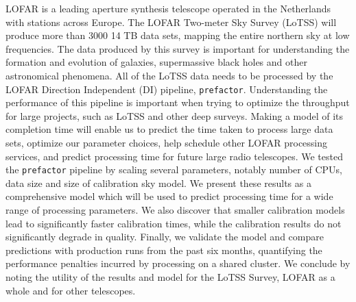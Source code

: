 LOFAR is a leading aperture synthesis telescope operated in the Netherlands with stations across Europe. The LOFAR Two-meter Sky Survey (LoTSS) will produce more than 3000 14 TB data sets, mapping the entire northern sky at low frequencies. The data produced by this survey is important for understanding the formation and evolution of galaxies, supermassive black holes and other astronomical phenomena. All of the LoTSS data needs to be processed by the LOFAR Direction Independent (DI) pipeline, \texttt{prefactor}. Understanding the performance of this pipeline is important when trying to optimize the throughput for  large projects, such as LoTSS and other deep surveys. Making a model of its completion time will enable us to predict the time taken to process large data sets, optimize our parameter choices, help schedule other LOFAR processing services, and predict processing time for future large radio telescopes. We tested the \texttt{prefactor} pipeline by scaling several parameters, notably number of CPUs, data size and size of calibration sky model. We present these results as a comprehensive model which will be used to predict processing time for a wide range of processing parameters. We also discover that smaller calibration models lead to significantly faster calibration times, while the calibration results do not significantly degrade in quality. Finally, we validate the model and compare predictions with production runs from the past six months, quantifying the performance penalties incurred by processing on a shared cluster. We conclude by noting the utility of the results and model for the LoTSS Survey, LOFAR as a whole and for other telescopes. 
